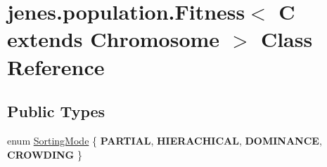 \hypertarget{classjenes_1_1population_1_1_fitness_3_01_c_01extends_01_chromosome_01_4}{
\section{jenes.population.Fitness$<$ C extends Chromosome $>$ Class Reference}
\label{classjenes_1_1population_1_1_fitness_3_01_c_01extends_01_chromosome_01_4}
}
\subsection*{Public Types}
\begin{CompactItemize}
\item 
enum \hyperlink{classjenes_1_1population_1_1_fitness_3_01_c_01extends_01_chromosome_01_4_c870345ce476556f78be491643dbb62d}{SortingMode} \{ \textbf{PARTIAL}, 
\textbf{HIERACHICAL}, 
\textbf{DOMINANCE}, 
\textbf{CROWDING}
 \}
\end{CompactItemize}

